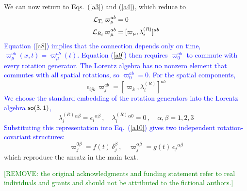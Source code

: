 \documentclass [prd,reprint,eqsecnum,nofootinbib]  {revtex4-1}
\newcommand{\lang}[1]{\textcolor{blue}{#1}}
\newcommand{\remove}[1]{\textcolor{green}{#1}}
\begin{document}
We can now return to Eqs.~(\ref{a3}) and (\ref{a4}), which reduce to
\begin{align}
    {\cal L}_{T_i}\,\varpi_\mu^{ab} &= 0\label{a8}\\  {\cal L}_{R_i}\,\varpi_\mu^{ab} &=  [\varpi_\mu,\lambda^{(R)}_i]^{ab}\label{a9}
\end{align}
\lang{Equation (\ref{a8}) implies that the connection depends only
on time, $\varpi_\mu^{ab}(x,t)=\varpi_\mu^{ab}(t)$. Equation
(\ref{a9}) then requires $\varpi_0^{ab}$ to commute with every
rotation generator. The Lorentz algebra has no nonzero element that
commutes with all spatial rotations, so $\varpi_0^{ab}=0$. For the
spatial components,}
\begin{equation}\label{a10}
\epsilon_{ijk}\, \varpi_j^{ab}=[\varpi_k,\lambda^{(R)}_i]^{ab}
\end{equation}
\lang{We choose the standard embedding of the rotation generators
into the Lorentz algebra $\sf{so}(3,1)$,}
\begin{equation}\label{a11}
\lambda^{(R)}_i{}^{\alpha\beta} = \epsilon_i{}^{\alpha\beta}\,,
\quad\lambda^{(R)}_i{}^{\alpha0} =0\,, \quad \alpha,\beta=1,2,3
\end{equation}
\lang{Substituting this representation into Eq.~(\ref{a10}) gives
two independent rotation-covariant structures:}
\begin{equation}\label{a12}
\varpi_j^{0\beta} =f(t) \, \delta_j^\beta\,, \quad \varpi_j^{\alpha\beta} =
g(t)\, \epsilon_j{}^{\alpha\beta}
\end{equation}
which reproduce the ansatz in the main text.

\begin{acknowledgments}
\remove{[REMOVE: the original acknowledgments and funding statement
refer to real individuals and grants and should not be attributed to
the fictional authors.]}
\end{acknowledgments}
\end{document}
